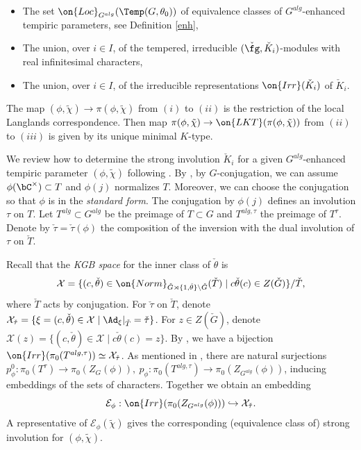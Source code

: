 \documentclass[12pt]{amsart}
\theoremstyle{remark}
\begin{document}
\begin{itemize}
	\item [(i)] The 
    set $\on{Loc}_{G^{alg}}(\Temp(G,\theta_0))$
    of equivalence classes of
    $G^{alg}$-enhanced tempiric parameters, see Definition \ref{enh},
	\item [(ii)] The union, over $i\in I$, of  
   the tempered, irreducible
  $(\check\fg,\check K_i)$-modules with real infinitesimal characters,
	\item [(iii)] The union, over $i\in I$, of the 
    irreducible representations $\on{Irr}(\check K_i)$
    of $\check K_i$.
    \end{itemize}
The map $(\phi,\tilde\chi)\rightarrow\pi(\phi,\tilde\chi)$
from
$(i)$ to $(ii)$ is the restriction of  the local Langlands correspondence. Then map 
$\pi(\phi,\tilde\chi)\rightarrow \on{LKT}(\pi(\phi,\tilde\chi))$ from $(ii)$ to $(iii)$
is given by its unique minimal $K$-type.

We review how to determine the strong involution $\check{K}_i$
for a given $G^{alg}$-enhanced tempiric parameter $(\phi,\tilde\chi)$ following \cite{AA}.
By \cite[Lemma 3.2]{AA}, by $G$-conjugation, we can assume
$\phi(\bC^\times)\subset T$ and $\phi(j)$ normalizes $T$.
Moreover, we can choose the conjugation so that $\phi$
is in the \emph{standard form}\cite[Definition 4.1]{AA}.
The conjugation by $\phi(j)$ defines an involution $\tau$ on $T$. 
Let $T^{alg}\subset G^{alg}$ be the preimage of $T\subset G$
and $T^{alg,\tau}$ the preimage of $T^\tau$.
Denote by $\check\tau=\check\tau(\phi)$ the composition of the inversion with the dual involution of $\tau$ on $\check T$.

Recall that the \emph{KGB space} for the inner class of $\check\theta$ is
\begin{equation}
    \mathcal{X}=\{(c,\check\theta)\in\on{Norm}_{\check G\rtimes\{1,\check\theta\}\backslash\check G}(\check T)\mid c\check\theta(c)\in Z(\check G)\}/\check T,
    \end{equation}
where $\check T$ acts by conjugation.
For $\check\tau$ on $\check T$, denote
$\mathcal{X}_{\check\tau}=\{\xi=(c,\check\theta)\in\mathcal{X}\mid\Ad_\xi|_{\check T}=\check\tau\}$.
For $z\in Z(\check{G})$, denote
$\mathcal{X}(z)=\{(c,\check\theta)\in\mathcal{X}\mid c\check\theta(c)=z\}$.
By \cite[Proposition 4.12]{AA}, we have a bijection
$\on{Irr}(\pi_0(T^{alg,\tau}))\simeq\mathcal{X}_{\check\tau}$.
As mentioned in \cite[\S4.4]{AA}, 
there are natural surjections
$p_\phi^0:\pi_0(T^\tau)\rightarrow \pi_0(Z_G(\phi)),\ 
p_\phi:\pi_0(T^{alg,\tau})\rightarrow \pi_0(Z_{G^{alg}}(\phi))$,
inducing embeddings of the sets of characters.
Together we obtain an embedding
\begin{equation}\label{eq:KGB fiber}
    \mathcal{E}_\phi:\on{Irr}(\pi_0(Z_{G^{alg}}(\phi)))\hookrightarrow\mathcal{X}_{\check\tau}.
\end{equation}
A representative of $\mathcal{E}_\phi(\tilde\chi)$
gives the corresponding (equivalence class of) 
strong involution for $(\phi,\tilde\chi)$.
\end{document}
